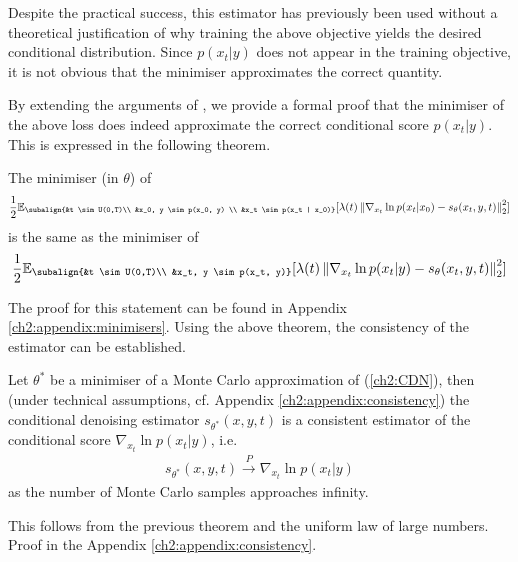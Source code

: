 Despite the practical success, this estimator has previously been used without a theoretical justification of why training the above objective yields the desired conditional distribution. Since $p(x_t|y)$ does not appear in the training objective, it is not obvious that the minimiser approximates the correct quantity. 

By extending the arguments of \cite{vincent2011connection}, we provide a formal proof that the minimiser of the above loss does indeed approximate the correct conditional score $p(x_t|y)$. This is expressed in the following theorem.

\begin{theorem}
    \label{ch2:thm:CDE_consistency}
    The minimiser (in $\theta$) of
    \begin{gather*}
    \begin{aligned}
            \frac{1}{2} \mathbb{E}_{\subalign{&t \sim U(0,T)\\ &x_0, y \sim p(x_0, y) \\ &x_t \sim p(x_t | x_0)}} 
            [\lambda(t) \norm{\nabla_{x_t} \ln{p(x_t | x_0)} - s_\theta(x_t, y, t)}_2^2]
    \end{aligned}
    \end{gather*}    
    is the same as the minimiser of 
    \begin{gather*}
        \frac{1}{2} \mathbb{E}_{\subalign{&t \sim U(0,T)\\ &x_t, y \sim p(x_t, y)}} 
        [\lambda(t) \norm{\nabla_{x_t} \ln{p(x_t | y)} - s_\theta(x_t, y,t)}_2^2]
    \end{gather*}
\end{theorem}
\noindent
The proof for this statement can be found in Appendix \ref{ch2:appendix:minimisers}. 
Using the above theorem, the consistency of the estimator can be established.
\begin{corollary}
    Let $\theta^\ast$ be a minimiser of a Monte Carlo approximation of (\ref{ch2:CDN}), then (under technical assumptions, cf. Appendix \ref{ch2:appendix:consistency}) the conditional denoising estimator $s_{\theta^\ast}(x,y,t)$ is a consistent estimator of the conditional score $\nabla_{x_t} \ln p(x_t | y)$, i.e.
    \begin{gather*}
        s_{\theta^\ast}(x,y,t) \overset{P}{\to} \nabla_{x_t} \ln p(x_t | y)   
    \end{gather*}
    as the number of Monte Carlo samples approaches infinity.
\end{corollary}
\noindent
This follows from the previous theorem and the uniform law of large numbers. Proof in the Appendix \ref{ch2:appendix:consistency}.

